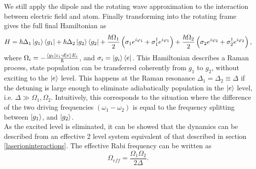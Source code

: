 We still apply the dipole and the rotating wave approximation to the interaction between electric field and atom. Finally transforming into the rotating frame gives the full final Hamiltonian as \cite{steck}
\begin{equation}
H = \hbar \Delta_1 \ket{g_1}\bra{g_1} + \hbar\Delta_2 \ket{g_2}\bra{g_2}+ \frac{\hbar \Omega_1}{2}\left(\sigma_1 e^{i\varphi_1} +\sigma_1^\dagger e^{i\varphi_1}\right)+ \frac{\hbar \Omega_2}{2}\left(\sigma_2 e^{i\varphi_2} +\sigma_2^\dagger e^{i\varphi_2}\right),
\end{equation}
where $\Omega_i = -\frac{\braket{g_1|\varepsilon_i \cdot d|e}E_{i}}{\hbar}$, and $\sigma_i = \ket{g_i}\bra{e}$. This Hamiltonian describes a Raman process, state population can be transferred coherently from $g_{1}$ to $g_{2}$, without exciting to the $\ket{e}$ level. This happens at the Raman resonance $\Delta_1 = \Delta_2 \equiv \Delta$ if the detuning is large enough to eliminate adiabatically population in the $\ket{e}$ level, i.e. $\Delta \gg \Omega_1,\Omega_2$. Intuitively, this corresponds to the situation where the difference of the two driving frequencies $(\omega_1-\omega_2)$ is equal to the frequency splitting between $\ket{g_1}$, and $\ket{g_2}$.\\
As the excited level is eliminated, it can be showed \cite{russo} that the dynamics can be described from an effective 2 level system equivalent of that described in section \ref{laserioninteractions}. The effective Rabi frequency can be written as
\begin{equation}
\Omega_{eff} = \frac{\Omega_1\Omega_2}{2\Delta}.
\end{equation}


